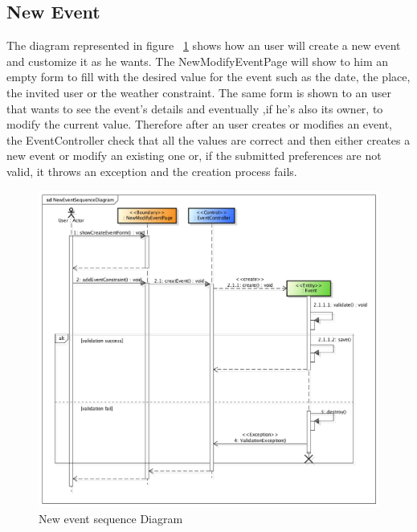  \subsection{New Event}
 The diagram represented in figure ~\ref{fig:newEveSeq} shows how an user will create a new event and customize it as he wants. The NewModifyEventPage will show to him an empty form to fill with the desired value for the event such as the date, the place, the invited user or the weather constraint. The same form is shown to an user that wants to see the event's details and eventually ,if he's also its owner, to modify the current value.
Therefore after an user creates or modifies an event, the EventController check that all the values are correct and then either creates a new event or modify an existing one or, if the submitted preferences are not valid, it throws an exception and the creation process fails.  
  \begin{center}
 \begin{figure}[H]
    \includegraphics[width=1\textwidth]{../BCEDiagram/BCE/EntityOverview/NewEventSequenceDiagram.png}
    \caption{New event sequence Diagram}
     \label{fig:newEveSeq}
     \end{figure}
   \end{center} 
